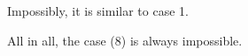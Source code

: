 \documentclass[preprint,12pt]{elsarticle}
\numberwithin{equation}{section}
\begin{document}
Impossibly, it is  similar to case 1.

All in all, the case (8) is always impossible.








\end{document}
